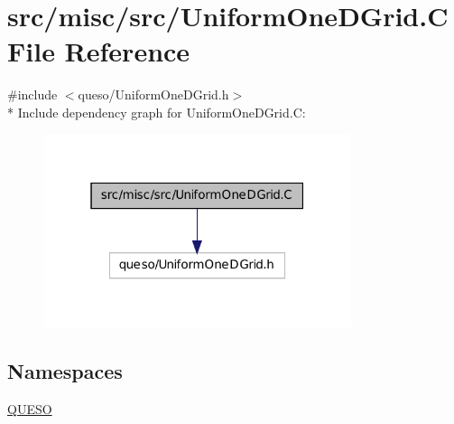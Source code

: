 \hypertarget{_uniform_one_d_grid_8_c}{\section{src/misc/src/\-Uniform\-One\-D\-Grid.C File Reference}
\label{_uniform_one_d_grid_8_c}
}
{\ttfamily \#include $<$queso/\-Uniform\-One\-D\-Grid.\-h$>$}\\*
Include dependency graph for Uniform\-One\-D\-Grid.\-C\-:
\nopagebreak
\begin{figure}[H]
\begin{center}
\leavevmode
\includegraphics[width=256pt]{_uniform_one_d_grid_8_c__incl}
\end{center}
\end{figure}
\subsection*{Namespaces}
\begin{DoxyCompactItemize}
\item 
\hyperlink{namespace_q_u_e_s_o}{Q\-U\-E\-S\-O}
\end{DoxyCompactItemize}
